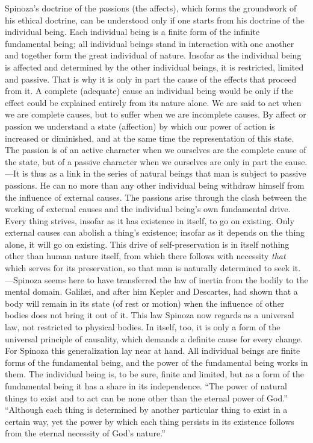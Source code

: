 \documentclass[12pt]{book}
\newcommand{\opage}[1]{\marginnote{\footnotesize\textit{[#1]}}}
\begin{document}
Spinoza's doctrine of the passions (the affects), which forms the groundwork of his
ethical doctrine, can be understood only if one starts from his doctrine of the
individual being. Each individual being is a finite form of the infinite fundamental
being; all individual beings stand in interaction with one another and together form
the great individual of nature. Insofar as the individual being is affected and
determined by the other individual beings, it is restricted, limited and passive. That
is why it is only in part the cause of the effects that proceed from it. A complete
(adequate) cause an individual being would be only if the effect could be explained
entirely from its nature alone. We are said to act when we are complete causes, but to
suffer when we are incomplete causes. By affect or passion we understand a state
(affection) by which our power of action \opage{125}is increased or diminished, and at
the same time the representation of this state. The passion is of an active character
when we ourselves are the complete cause of the state, but of a passive character when
we ourselves are only in part the cause.
---It is thus as a link in the series of natural beings that man is subject to passive
passions. He can no more than any other individual being withdraw himself from the
influence of external causes. The passions arise through the clash between the working
of external causes and the individual being's own fundamental drive. Every thing
strives, insofar as it has existence in itself, to go on existing. Only external causes
can abolish a thing's existence; %
insofar as it depends on the thing alone, it will go on existing. This drive of
self-preservation is in itself nothing other than human nature itself, from which there
follows with necessity \emph{that} which serves for its preservation, so that man is
naturally determined to seek it.---Spinoza seems here to have transferred the law of
inertia from the bodily to the mental domain. Galilæi, and after him Kepler and
Descartes, had shown that a body will remain in its state (of rest or motion) when the
influence of other bodies does not bring it out of it. This law Spinoza now regards as a
universal law, not restricted to physical bodies. In itself, too, it is only a form of
the universal principle of causality, %
which demands a definite cause for every change. For Spinoza this generalization lay
near at hand. All individual beings are finite forms of the fundamental being, and the
power of the fundamental being works in them. The individual being is, to be sure,
finite and limited, but as a form \opage{126}of the fundamental being it has a share in
its independence. ``The power of natural things to exist and to act can be none other
than the eternal power of God.'' ``Although each thing is determined by another
particular thing to exist in a certain way, yet the power by which each thing persists
in its existence follows from the eternal necessity of God's nature.''
\end{document}
